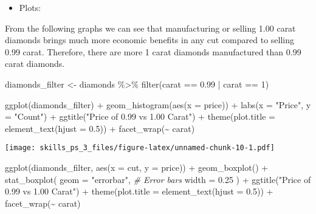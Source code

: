 \documentclass[
]{article}
\newenvironment{Shaded}{\begin{snugshade}}{\end{snugshade}}
\newcommand{\AttributeTok}[1]{\textcolor[rgb]{0.77,0.63,0.00}{#1}}
\newcommand{\CommentTok}[1]{\textcolor[rgb]{0.56,0.35,0.01}{\textit{#1}}}
\newcommand{\DecValTok}[1]{\textcolor[rgb]{0.00,0.00,0.81}{#1}}
\newcommand{\FloatTok}[1]{\textcolor[rgb]{0.00,0.00,0.81}{#1}}
\newcommand{\FunctionTok}[1]{\textcolor[rgb]{0.00,0.00,0.00}{#1}}
\newcommand{\NormalTok}[1]{#1}
\newcommand{\OtherTok}[1]{\textcolor[rgb]{0.56,0.35,0.01}{#1}}
\newcommand{\SpecialCharTok}[1]{\textcolor[rgb]{0.00,0.00,0.00}{#1}}
\newcommand{\StringTok}[1]{\textcolor[rgb]{0.31,0.60,0.02}{#1}}
\providecommand{\tightlist}{%
  \setlength{\itemsep}{0pt}\setlength{\parskip}{0pt}}
\begin{document}
\begin{itemize}
\tightlist
\item
  Plots:
\end{itemize}

From the following graphs we can see that manufacturing or selling 1.00
carat diamonds brings much more economic benefits in any cut compared to
selling 0.99 carat. Therefore, there are more 1 carat diamonds
manufactured than 0.99 carat diamonds.

\begin{Shaded}
\begin{Highlighting}[]
\NormalTok{diamonds\_filter }\OtherTok{\textless{}{-}}\NormalTok{ diamonds }\SpecialCharTok{\%\textgreater{}\%}
  \FunctionTok{filter}\NormalTok{(carat }\SpecialCharTok{==} \FloatTok{0.99} \SpecialCharTok{|}\NormalTok{ carat }\SpecialCharTok{==} \DecValTok{1}\NormalTok{)}
\end{Highlighting}
\end{Shaded}

\begin{Shaded}
\begin{Highlighting}[]
\FunctionTok{ggplot}\NormalTok{(diamonds\_filter) }\SpecialCharTok{+} 
  \FunctionTok{geom\_histogram}\NormalTok{(}\FunctionTok{aes}\NormalTok{(}\AttributeTok{x =}\NormalTok{ price)) }\SpecialCharTok{+}
  \FunctionTok{labs}\NormalTok{(}\AttributeTok{x =} \StringTok{"Price"}\NormalTok{, }\AttributeTok{y =} \StringTok{"Count"}\NormalTok{) }\SpecialCharTok{+}
  \FunctionTok{ggtitle}\NormalTok{(}\StringTok{"Price of 0.99 vs 1.00 Carat"}\NormalTok{) }\SpecialCharTok{+}
  \FunctionTok{theme}\NormalTok{(}\AttributeTok{plot.title =} \FunctionTok{element\_text}\NormalTok{(}\AttributeTok{hjust =} \FloatTok{0.5}\NormalTok{)) }\SpecialCharTok{+}
  \FunctionTok{facet\_wrap}\NormalTok{(}\SpecialCharTok{\textasciitilde{}}\NormalTok{ carat)}
\end{Highlighting}
\end{Shaded}

\texttt{[image: skills\_ps\_3\_files/figure-latex/unnamed-chunk-10-1.pdf]}

\begin{Shaded}
\begin{Highlighting}[]
\FunctionTok{ggplot}\NormalTok{(diamonds\_filter, }\FunctionTok{aes}\NormalTok{(}\AttributeTok{x =}\NormalTok{ cut, }\AttributeTok{y =}\NormalTok{ price)) }\SpecialCharTok{+} 
  \FunctionTok{geom\_boxplot}\NormalTok{() }\SpecialCharTok{+}
  \FunctionTok{stat\_boxplot}\NormalTok{(}
    \AttributeTok{geom =} \StringTok{"errorbar"}\NormalTok{, }\CommentTok{\# Error bars}
    \AttributeTok{width =} \FloatTok{0.25}
\NormalTok{  ) }\SpecialCharTok{+}
  \FunctionTok{ggtitle}\NormalTok{(}\StringTok{"Price of 0.99 vs 1.00 Carat"}\NormalTok{) }\SpecialCharTok{+}
  \FunctionTok{theme}\NormalTok{(}\AttributeTok{plot.title =} \FunctionTok{element\_text}\NormalTok{(}\AttributeTok{hjust =} \FloatTok{0.5}\NormalTok{)) }\SpecialCharTok{+}
  \FunctionTok{facet\_wrap}\NormalTok{(}\SpecialCharTok{\textasciitilde{}}\NormalTok{ carat)}
\end{Highlighting}
\end{Shaded}
\end{document}
